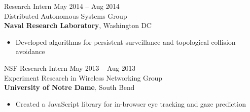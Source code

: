 \documentclass[line,margin]{cv}
\begin{document}
\begin{resume}
\begin{itemize}
\end{itemize}



%
%
%


Research Intern
\hfill May 2014 -- Aug 2014 \\
Distributed Autonomous Systems Group\\
\textbf{Naval Research Laboratory}, Washington DC
\begin{itemize}

    \item Developed algorithms for persistent surveillance and topological
        collision avoidance

\end{itemize}

%
%
%
%

%
%

NSF Research Intern
\hfill May 2013 -- Aug 2013 \\
Experiment Research in Wireless Networking Group\\\textbf{University of Notre Dame}, South Bend
\begin{itemize}
    \item Created a JavaScript library for in-browser eye tracking and gaze prediction
\end{itemize}



\end{resume}
\end{document}
